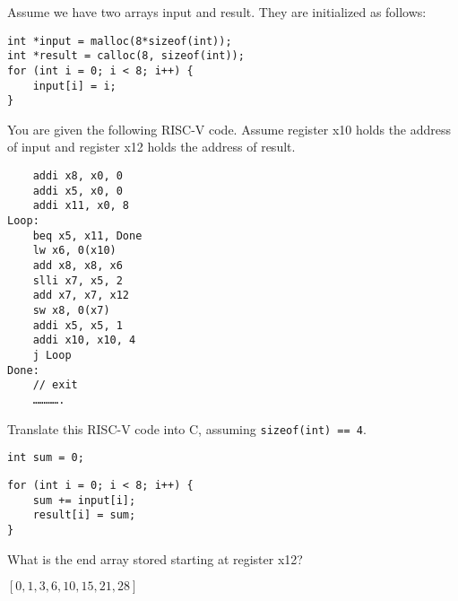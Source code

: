 \begin{blocksection}
\question Assume we have two arrays input and result. They are initialized as follows:

\begin{verbatim}
int *input = malloc(8*sizeof(int));
int *result = calloc(8, sizeof(int));
for (int i = 0; i < 8; i++) {
    input[i] = i;
}
\end{verbatim}

You are given the following RISC-V code. Assume register x10 holds the address of input and register x12 holds the address of result.

\begin{verbatim}
    addi x8, x0, 0
    addi x5, x0, 0
    addi x11, x0, 8
Loop:
    beq x5, x11, Done
    lw x6, 0(x10)
    add x8, x8, x6
    slli x7, x5, 2
    add x7, x7, x12
    sw x8, 0(x7)
    addi x5, x5, 1
    addi x10, x10, 4
    j Loop
Done:
    // exit
    ………….
\end{verbatim}

Translate this RISC-V code into C, assuming \texttt{sizeof(int) == 4}.

\begin{verbatim}
int sum = 0;
\end{verbatim}
\begin{solution}[0.7in]
\begin{verbatim}
for (int i = 0; i < 8; i++) {
    sum += input[i];
    result[i] = sum;
}
\end{verbatim}
\end{solution}

\question What is the end array stored starting at register x12?

\begin{solution}
$[0, 1, 3, 6, 10, 15, 21, 28]$
\end{solution}
\end{blocksection}
